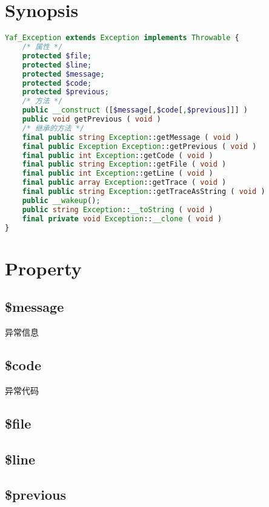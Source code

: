 \section{Synopsis}


\begin{lstlisting}[language=PHP]
Yaf_Exception extends Exception implements Throwable {
    /* 属性 */
    protected $file;
    protected $line;
    protected $message;
    protected $code;
    protected $previous;
    /* 方法 */
    public __construct ([$message[,$code[,$previous]]] )
    public void getPrevious ( void )
    /* 继承的方法 */
    final public string Exception::getMessage ( void )
    final public Exception Exception::getPrevious ( void )
    final public int Exception::getCode ( void )
    final public string Exception::getFile ( void )
    final public int Exception::getLine ( void )
    final public array Exception::getTrace ( void )
    final public string Exception::getTraceAsString ( void )
    public __wakeup();
    public string Exception::__toString ( void )
    final private void Exception::__clone ( void )
}
\end{lstlisting}

\section{Property}


\subsection{\$message}

异常信息

\subsection{\$code}

异常代码

\subsection{\$file}


\subsection{\$line}


\subsection{\$previous}

